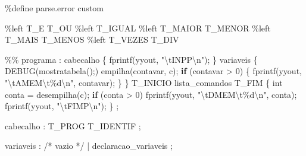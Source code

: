 \documentclass[
  brazilian,
  letterpaper,
]{book}
\newenvironment{Shaded}{\begin{snugshade}}{\end{snugshade}}
\newcommand{\CharTok}[1]{\textcolor[rgb]{0.13,0.47,0.30}{#1}}
\newcommand{\CommentTok}[1]{\textcolor[rgb]{0.37,0.37,0.37}{#1}}
\newcommand{\ControlFlowTok}[1]{\textcolor[rgb]{0.00,0.23,0.31}{\textbf{#1}}}
\newcommand{\DataTypeTok}[1]{\textcolor[rgb]{0.68,0.00,0.00}{#1}}
\newcommand{\DecValTok}[1]{\textcolor[rgb]{0.68,0.00,0.00}{#1}}
\newcommand{\NormalTok}[1]{\textcolor[rgb]{0.00,0.23,0.31}{#1}}
\newcommand{\OperatorTok}[1]{\textcolor[rgb]{0.37,0.37,0.37}{#1}}
\newcommand{\SpecialCharTok}[1]{\textcolor[rgb]{0.37,0.37,0.37}{#1}}
\newcommand{\StringTok}[1]{\textcolor[rgb]{0.13,0.47,0.30}{#1}}
\theoremstyle{plain}
\theoremstyle{definition}
\theoremstyle{remark}
\begin{document}
\begin{Shaded}
\begin{Highlighting}[]
\OperatorTok{\%}\NormalTok{define parse}\OperatorTok{.}\NormalTok{error custom}

\OperatorTok{\%}\NormalTok{left T\_E T\_OU}
\OperatorTok{\%}\NormalTok{left T\_IGUAL}
\OperatorTok{\%}\NormalTok{left T\_MAIOR T\_MENOR}
\OperatorTok{\%}\NormalTok{left T\_MAIS T\_MENOS}
\OperatorTok{\%}\NormalTok{left T\_VEZES T\_DIV}

\OperatorTok{\%\%}
\NormalTok{programa}
    \OperatorTok{:}\NormalTok{ cabecalho }
         \OperatorTok{\{}\NormalTok{ fprintf}\OperatorTok{(}\NormalTok{yyout}\OperatorTok{,} \StringTok{"}\SpecialCharTok{\textbackslash{}t}\StringTok{INPP}\SpecialCharTok{\textbackslash{}n}\StringTok{"}\OperatorTok{);} \OperatorTok{\}}
\NormalTok{      variaveis }
         \OperatorTok{\{} 
\NormalTok{            DEBUG}\OperatorTok{(}\NormalTok{mostratabela}\OperatorTok{();)}
\NormalTok{            empilha}\OperatorTok{(}\NormalTok{contavar}\OperatorTok{,} \CharTok{\textquotesingle{}c\textquotesingle{}}\OperatorTok{);}
            \ControlFlowTok{if} \OperatorTok{(}\NormalTok{contavar }\OperatorTok{\textgreater{}} \DecValTok{0}\OperatorTok{)} \OperatorTok{\{}
\NormalTok{               fprintf}\OperatorTok{(}\NormalTok{yyout}\OperatorTok{,} \StringTok{"}\SpecialCharTok{\textbackslash{}t}\StringTok{AMEM}\SpecialCharTok{\textbackslash{}t\%d\textbackslash{}n}\StringTok{"}\OperatorTok{,}\NormalTok{ contavar}\OperatorTok{);}
            \OperatorTok{\}} 
         \OperatorTok{\}}
\NormalTok{      T\_INICIO lista\_comandos T\_FIM}
         \OperatorTok{\{}
            \DataTypeTok{int}\NormalTok{ conta }\OperatorTok{=}\NormalTok{ desempilha}\OperatorTok{(}\CharTok{\textquotesingle{}c\textquotesingle{}}\OperatorTok{);}
            \ControlFlowTok{if} \OperatorTok{(}\NormalTok{conta }\OperatorTok{\textgreater{}} \DecValTok{0}\OperatorTok{)} 
\NormalTok{               fprintf}\OperatorTok{(}\NormalTok{yyout}\OperatorTok{,} \StringTok{"}\SpecialCharTok{\textbackslash{}t}\StringTok{DMEM}\SpecialCharTok{\textbackslash{}t\%d\textbackslash{}n}\StringTok{"}\OperatorTok{,}\NormalTok{ conta}\OperatorTok{);}
\NormalTok{            fprintf}\OperatorTok{(}\NormalTok{yyout}\OperatorTok{,} \StringTok{"}\SpecialCharTok{\textbackslash{}t}\StringTok{FIMP}\SpecialCharTok{\textbackslash{}n}\StringTok{"}\OperatorTok{);} 
         \OperatorTok{\}}
    \OperatorTok{;}

\NormalTok{cabecalho}
    \OperatorTok{:}\NormalTok{ T\_PROG T\_IDENTIF}
    \OperatorTok{;}

\NormalTok{variaveis}
    \OperatorTok{:} \CommentTok{/* vazio */}
    \OperatorTok{|}\NormalTok{ declaracao\_variaveis}
    \OperatorTok{;}


\end{Highlighting}
\end{Shaded}
\end{document}
